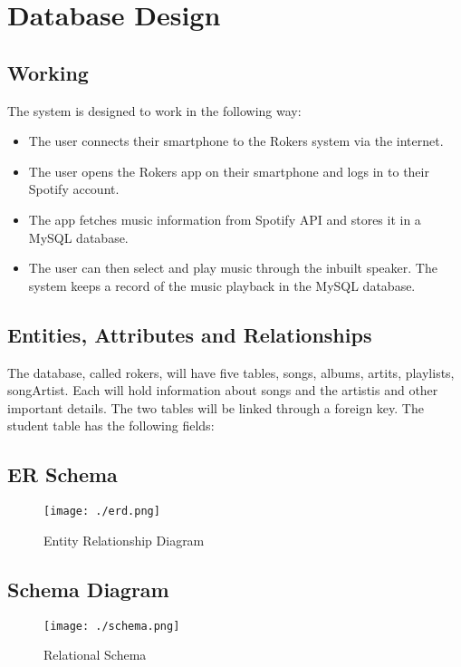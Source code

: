 \chapter{Database Design}

\section{Working}
The system is designed to work in the following way:
\begin{itemize}
    \item The user connects their smartphone to the Rokers system via the internet.
    \item The user opens the Rokers app on their smartphone and logs in to their Spotify account.
    \item The app fetches music information from Spotify API and stores it in a MySQL database.
    \item The user can then select and play music through the inbuilt speaker.
The system keeps a record of the music playback in the MySQL database.
\end{itemize}





\section{Entities, Attributes and Relationships}
The database, called rokers, will have five tables, songs, albums, artits, playlists, songArtist. Each will hold information about songs and the artistis and other important details. The two
tables will be linked through a foreign key. The student table has the following fields:\\

\section{ER Schema}
\begin{figure}[H]
\centering
\caption{Entity Relationship Diagram}
\texttt{[image: ./erd.png]}
\\[0.2in]
\label{fig:Entitiy Relationship Diagram}
\end{figure}

\pagebreak
\thispagestyle{fancy}

\section{Schema Diagram}
\begin{figure}[H]
\centering
\caption{Relational Schema}
\texttt{[image: ./schema.png]}
\\[0.2in]
\label{fig:Relational Schema}
\end{figure}

\thispagestyle{fancy}